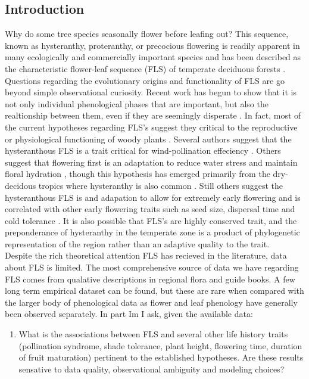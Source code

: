 \documentclass{article}\usepackage[]{graphicx}\usepackage[]{color}
\begin{document}
\begin{itemize}
\subsection*{Introduction}
Why do some tree species seasonally flower before leafing out? This sequence, known as hysteranthy, proteranthy, or precocious flowering is readily apparent in many ecologically and commercially important species and has been described as  the characteristic flower-leaf sequence (FLS) of temperate deciduous forests \citep{}. Questions regarding the evolutionary origins and functionality of FLS are go beyond simple observational curiosity. Recent work has begun to show that it is not only individual phenological phases that are important, but also the realtionship between them, even if they are seemingly disperate \citep{}. In fact, most of the current hypotheses regarding FLS's suggest they critical to the reproductive or physiological functioning of woody plants \citep{}. Several authors suggest that the hysteranthous FLS is a trait critical for wind-pollination effeciency \citep{}. Others suggest that flowering first is an adaptation to reduce water stress and maintain floral hydration \citep{}, though this hypothesis has emerged primarily from the dry-decidous tropics where hysteranthy is also common \citep{}.  Still others suggest the hysteranthous FLS is and adapation to allow for extremely early flowering and is correlated with other early flowering traits such as seed size, dispersal time and cold tolerance \citep{}. It is also possible that FLS's are highly conserved trait, and the preponderance of hysteranthy in the temperate zone is a product of phylogenetic representation of the region rather than an adaptive quality to the trait.\\
\indent Despite the rich theoretical attention FLS has recieved in the literature, data about FLS is limited. The most comprehensive source of data we have regarding FLS comes from qualative descriptions in regional flora and guide books. A few long term empirical dataset can be found, but these are rare when compared with the larger body of phenological data as flower and leaf phenology have generally been observed separately{}. In part Im I ask, given the available data:
\begin{enumerate}
\item  What is the associations between FLS and several other life history traits (pollination syndrome, shade tolerance, plant height, flowering time, duration of fruit maturation) pertinent to the established hypotheses. Are these results sensative to data quality, observational ambiguity and modeling choices?

\end{enumerate}
\end{itemize}
\end{document}
